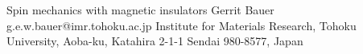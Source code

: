 \begin{conf-abstract}[]
{Spin mechanics with magnetic insulators}
{\color{blue} Gerrit Bauer}
{g.e.w.bauer@imr.tohoku.ac.jp}
{Institute for Materials Research, Tohoku University, Aoba-ku, Katahira 2-1-1 Sendai 980-8577, Japan}
{\decofourleft \decofourright}





\printbibliography[heading=none]

\end{conf-abstract}
